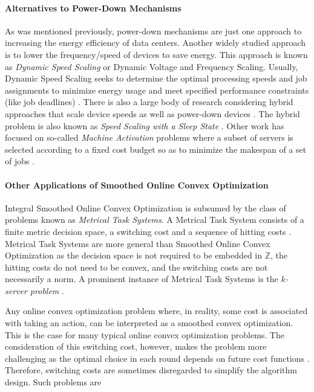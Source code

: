 \paragraph{Alternatives to Power-Down Mechanisms} As was mentioned previously, power-down mechanisms are just one approach to increasing the energy efficiency of data centers. Another widely studied approach is to lower the frequency/speed of devices to save energy. This approach is known as \textit{Dynamic Speed Scaling} or Dynamic Voltage and Frequency Scaling. Usually, Dynamic Speed Scaling seeks to determine the optimal processing speeds and job assignments to minimize energy usage and meet specified performance constraints (like job deadlines) \cite{Albers2007, Albers2011, Jin2016}. There is also a large body of research considering hybrid approaches that scale device speeds as well as power-down devices \cite{Jin2016}. The hybrid problem is also known as \textit{Speed Scaling with a Sleep State} \cite{Albers2014}. Other work has focused on so-called \textit{Machine Activation} problems where a subset of servers is selected according to a fixed cost budget so as to minimize the makespan of a set of jobs \cite{Khuller2009, Li2011}.

\paragraph{Other Applications of Smoothed Online Convex Optimization} Integral Smoothed Online Convex Optimization is subsumed by the class of problems known as \textit{Metrical Task Systems}. A Metrical Task System consists of a finite metric decision space, a switching cost and a sequence of hitting costs \cite{Bubeck2018_3}. Metrical Task Systems are more general than Smoothed Online Convex Optimization as the decision space is not required to be embedded in $\mathbb{Z}$, the hitting costs do not need to be convex, and the switching costs are not necessarily a norm. A prominent instance of Metrical Task Systems is the \textit{$k$-server problem} \cite{Bubeck2017}.

Any online convex optimization problem where, in reality, some cost is associated with taking an action, can be interpreted as a smoothed convex optimization. This is the case for many typical online convex optimization problems. The consideration of this switching cost, however, makes the problem more challenging as the optimal choice in each round depends on future cost functions \cite{Chen2015}. Therefore, switching costs are sometimes disregarded to simplify the algorithm design. Such problems are

